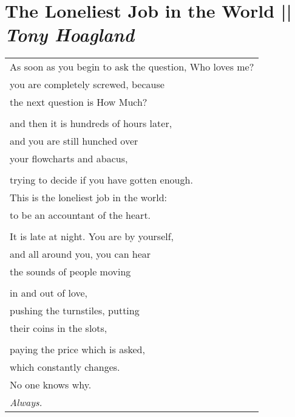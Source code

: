 
\section[The Loneliest Job in the World]{The Loneliest Job in the World || \emph{Tony Hoagland} \hspace*{\fill}  \thepage}
\vspace*{0.6cm}
\begin{center}
\begin{tabular}{l}
As soon as you begin to ask the question, Who loves me?\\
you are completely screwed, because\\
the next question is How Much?\\
\\and then it is hundreds of hours later,\\
and you are still hunched over\\
your flowcharts and abacus,\\
\\trying to decide if you have gotten enough.\\
This is the loneliest job in the world:\\
to be an accountant of the heart.\\
\\It is late at night. You are by yourself,\\
and all around you, you can hear\\
the sounds of people moving\\
\\in and out of love,\\
pushing the turnstiles, putting\\
their coins in the slots,\\
\\paying the price which is asked,\\
which constantly changes.\\
No one knows why.\\
\emph{Always.}
\end{tabular}
\end{center}